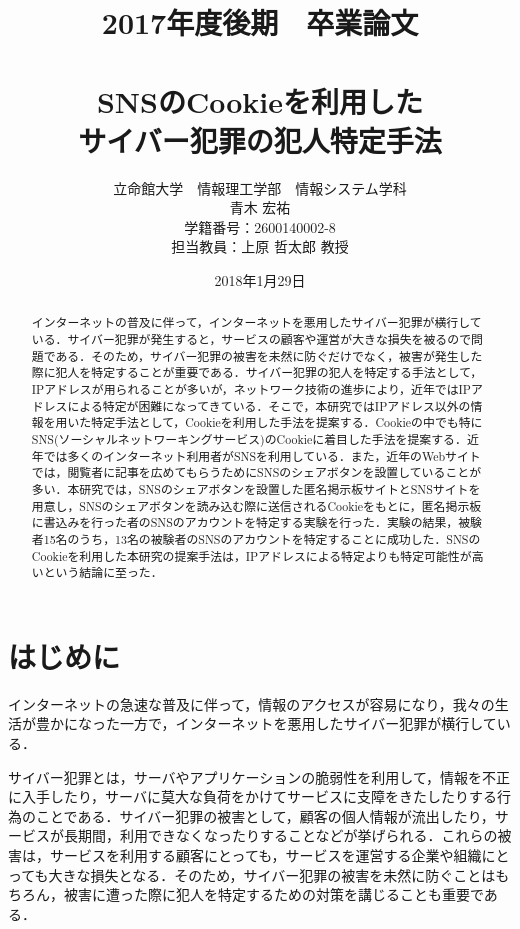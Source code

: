 \documentclass[10pt, a4paper]{jreport}
\title{2017年度後期　卒業論文\\　\\SNSのCookieを利用した\\サイバー犯罪の犯人特定手法}
\author{立命館大学　情報理工学部　情報システム学科\\青木 宏祐\\学籍番号：2600140002-8\\担当教員：上原 哲太郎 教授}
\date{2018年1月29日}
\begin{document}
\maketitle


\begin{abstract}
インターネットの普及に伴って，インターネットを悪用したサイバー犯罪が横行している．サイバー犯罪が発生すると，サービスの顧客や運営が大きな損失を被るので問題である．そのため，サイバー犯罪の被害を未然に防ぐだけでなく，被害が発生した際に犯人を特定することが重要である．サイバー犯罪の犯人を特定する手法として，IPアドレスが用られることが多いが，ネットワーク技術の進歩により，近年ではIPアドレスによる特定が困難になってきている．そこで，本研究ではIPアドレス以外の情報を用いた特定手法として，Cookieを利用した手法を提案する．Cookieの中でも特にSNS(ソーシャルネットワーキングサービス)のCookieに着目した手法を提案する．近年では多くのインターネット利用者がSNSを利用している．また，近年のWebサイトでは，閲覧者に記事を広めてもらうためにSNSのシェアボタンを設置していることが多い．本研究では，SNSのシェアボタンを設置した匿名掲示板サイトとSNSサイトを用意し，SNSのシェアボタンを読み込む際に送信されるCookieをもとに，匿名掲示板に書込みを行った者のSNSのアカウントを特定する実験を行った．実験の結果，被験者15名のうち，13名の被験者のSNSのアカウントを特定することに成功した．SNSのCookieを利用した本研究の提案手法は，IPアドレスによる特定よりも特定可能性が高いという結論に至った．
\end{abstract}

\tableofcontents

\chapter{はじめに}
\setcounter{page}{1}
インターネットの急速な普及に伴って，情報のアクセスが容易になり，我々の生活が豊かになった一方で，インターネットを悪用したサイバー犯罪が横行している．

サイバー犯罪とは，サーバやアプリケーションの脆弱性を利用して，情報を不正に入手したり，サーバに莫大な負荷をかけてサービスに支障をきたしたりする行為のことである．サイバー犯罪の被害として，顧客の個人情報が流出したり，サービスが長期間，利用できなくなったりすることなどが挙げられる．これらの被害は，サービスを利用する顧客にとっても，サービスを運営する企業や組織にとっても大きな損失となる．そのため，サイバー犯罪の被害を未然に防ぐことはもちろん，被害に遭った際に犯人を特定するための対策を講じることも重要である．
\end{document}
